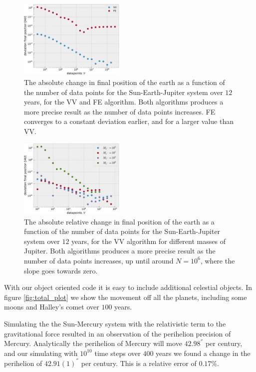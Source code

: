 \documentclass[%
 reprint,
nofootinbib,
aps,
]{revtex4-1}
\begin{document}
\begin{figure}
  \centering
  \includegraphics[width=0.45\textwidth]{../figures/change_position.pdf}
  \caption{The absolute change in final position of the earth as a function of the number of data points for the Sun-Earth-Jupiter system over $12$ years, for the VV and FE algorithm. Both algorithms produces a more precise result as the number of data points increases. FE converges to a constant deviation earlier, and for a larger value than VV.}
  \label{fig:change_position}
\end{figure}

\begin{figure}
  \centering
  \includegraphics[width=0.45\textwidth]{../figures/change_position_MJ.pdf}
  \caption{The absolute relative change in final position of the earth as a function of the number of data points for the Sun-Earth-Jupiter system over $12$ years, for the VV algorithm for different masses of Jupiter. Both algorithms produces a more precise result as the number of data points increases, up until around $N=10^6$, where the slope goes towards zero.}
  \label{fig:change_position_MJ}
\end{figure}

With our object oriented code it is easy to include additional celestial objects. In figure \vref{fig:total_plot} we show the movement off all the planets, including some moons and Halley's comet over $100$ years.

Simulating the the Sun-Mercury system with the relativistic term to the gravitational force resulted in an observation of the perihelion precision of Mercury. Analytically the perihelion of Mercury will move $42.98^{''}$ per century, and our simulating with $10^{10}$ time steps over $400$ years we found a change in the perihelion of $42.91(1)^{''}$ per century. This is a relative error of $0.17\%$.
\end{document}
